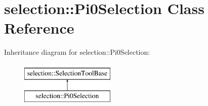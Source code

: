 \hypertarget{classselection_1_1Pi0Selection}{\section{selection\-:\-:Pi0\-Selection Class Reference}
\label{classselection_1_1Pi0Selection}
}
Inheritance diagram for selection\-:\-:Pi0\-Selection\-:\begin{figure}[H]
\begin{center}
\leavevmode
\includegraphics[height=2.000000cm]{classselection_1_1Pi0Selection}
\end{center}
\end{figure}
